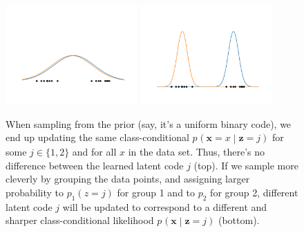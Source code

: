 \documentclass{article}
\newcommand{\condprob}[4]{{#1}_{#2} \left( #3 \middle| #4 \right)}
\newcommand{\x}{\mathbf{x}}
\newcommand{\z}{\mathbf{z}}
\begin{document}
\begin{figure}[tbh]
\begin{center}
\includegraphics[width=0.45\textwidth]{figures/mixture_bad.png}
\vfill
\includegraphics[width=0.45\textwidth]{figures/mixture_good.png}
\caption{\small When sampling from the prior (say, it's a uniform binary code), we end up updating the same class-conditional ${\condprob{p}{}{\x=x}{\z=j}}$ for some $j\in\{1,2\}$ and for all $x$ in the data set. 
Thus, there's no difference between the learned latent code $j$ (top).
If we sample more cleverly by grouping the data points, and assigning larger probability to $p_1(z=j)$ for group 1 and to $p_2$ for group 2, different latent code $j$ will be updated to correspond to a different and sharper class-conditional likelihood ${\condprob{p}{}{\x}{\z=j}}$ (bottom). }
\label{fig:fromprior1}
\end{center}
\end{figure}
\end{document}
